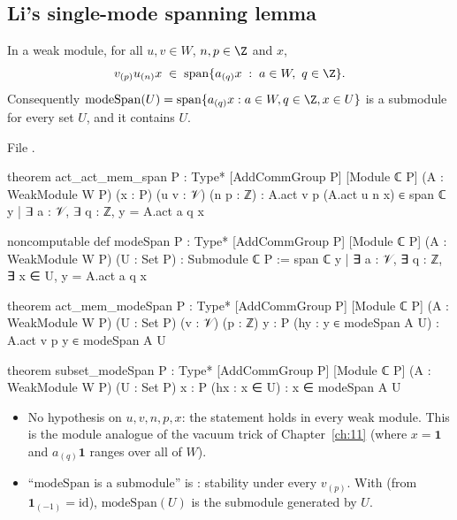 \subsection{Li's single-mode spanning lemma}\label{ch12:sec:li}

\begin{theorem}[Li's lemma]\label{ch12:thm:li}
In a weak module, for all $u,v\in W$, $n,p\in\Z$ and $x$,
\begin{equation*}
  v_{(p)}u_{(n)}x\;\in\;\operatorname{span}\{a_{(q)}x \;:\; a\in W,\ q\in\Z\}.
\end{equation*}
Consequently $\mathrm{modeSpan}(U)=\operatorname{span}\{a_{(q)}x:a\in W,q\in\Z,x\in U\}$ is a
submodule for every set $U$, and it contains $U$.
\end{theorem}
File .
\begin{leancode}
theorem act_act_mem_span {P : Type*} [AddCommGroup P] [Module ℂ P] (A : WeakModule W P) (x : P)
    (u v : 𝒱) (n p : ℤ) :
    A.act v p (A.act u n x) ∈ span ℂ {y | ∃ a : 𝒱, ∃ q : ℤ, y = A.act a q x}

noncomputable def modeSpan {P : Type*} [AddCommGroup P] [Module ℂ P] (A : WeakModule W P)
    (U : Set P) : Submodule ℂ P :=
  span ℂ {y | ∃ a : 𝒱, ∃ q : ℤ, ∃ x ∈ U, y = A.act a q x}

theorem act_mem_modeSpan {P : Type*} [AddCommGroup P] [Module ℂ P] (A : WeakModule W P)
    (U : Set P) (v : 𝒱) (p : ℤ) {y : P} (hy : y ∈ modeSpan A U) : A.act v p y ∈ modeSpan A U

theorem subset_modeSpan {P : Type*} [AddCommGroup P] [Module ℂ P] (A : WeakModule W P)
    (U : Set P) {x : P} (hx : x ∈ U) : x ∈ modeSpan A U
\end{leancode}
\begin{dictionary}
\begin{itemize}
\item No hypothesis on $u,v,n,p,x$: the statement holds in every weak module.  This is the
  module analogue of the vacuum trick of Chapter~\ref{ch:11} (where $x=\mathbf 1$ and
  $a_{(q)}\mathbf 1$ ranges over all of $W$).
\item ``$\mathrm{modeSpan}$ is a submodule'' is : stability under every
  $v_{(p)}$.  With  (from $\mathbf 1_{(-1)}=\mathrm{id}$), $\mathrm{modeSpan}(U)$
  is the submodule generated by $U$.
\end{itemize}
\end{dictionary}


